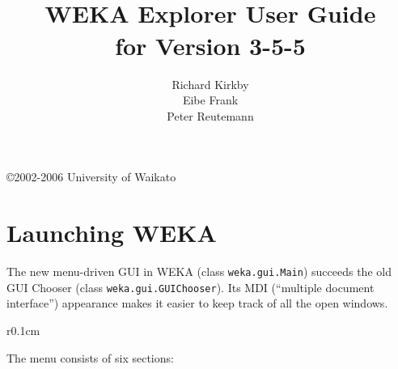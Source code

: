 \documentclass[a4paper]{article}
\title{\epsfig{file=images/coat_of_arms.eps,width=10cm}\vspace{3cm}\\WEKA Explorer User Guide\\for Version 3-5-5}
\author{Richard Kirkby\\Eibe Frank\\Peter Reutemann}
\begin{document}
\begin{titlepage}

\maketitle
\thispagestyle{empty}

\center
\vspace{7.5cm}

\copyright 2002-2006 University of Waikato

\end{titlepage}

\tableofcontents

\newpage

\section{Launching WEKA}

The new menu-driven GUI in WEKA (class \texttt{weka.gui.Main}) succeeds the old GUI Chooser (class \texttt{weka.gui.GUIChooser}). Its MDI (``multiple document interface'') appearance makes it easier to keep track of all the open windows.

\begin{center}
\end{center}

\begin{wrapfigure}{r}{0.1cm}
	\vspace{0.2cm}

	\vspace{0.2cm}

	\vspace{0.2cm}

	\vspace{0.2cm}

	\vspace{0.2cm}

	\vspace{0.2cm}
\end{wrapfigure}

The menu consists of six sections:
\end{document}
